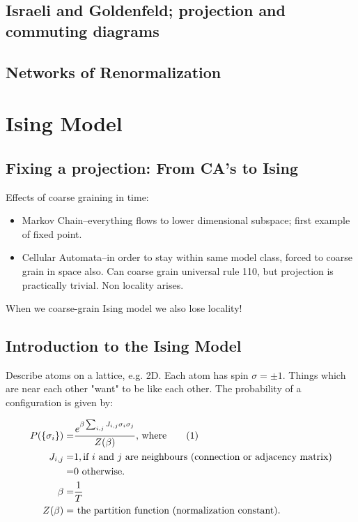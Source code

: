 \documentclass[]{article}
\newcommand\numberthis{\addtocounter{equation}{1}\tag{\theequation}}
\begin{document}
\subsection{Israeli and Goldenfeld; projection and commuting diagrams }

\subsection{Networks of Renormalization}

\cite{israeli2004computational,israeli2006coarse,dedeo2018origin}
\section{Ising Model}

\subsection{Fixing a projection: From CA’s to Ising}
Effects of coarse graining in time:
\begin{itemize}
	\item Markov Chain--everything flows to lower dimensional subspace; first example of fixed point.
	\item Cellular Automata--in order to stay within same model class, forced to coarse grain in space also. Can coarse grain universal rule 110, but projection is practically trivial. Non locality arises. 
\end{itemize}

When we coarse-grain Ising model we also lose locality!
\subsection{Introduction to the Ising Model}

Describe atoms on a lattice, e.g. 2D. Each atom has spin $\sigma=\pm 1$. Things which are near each other "want" to be like each other. The probability of a configuration is given by:

\begin{align*}
P(\{\sigma_i\}) =& \frac{e^{\beta \sum_{i,j} J_{i,j} \sigma_i \sigma_j}}{Z(\beta)}\text{, where} \numberthis \label{eq:coarse_ising:P} \\
J_{i,j} =& 1,\text{if $i$ and $j$ are neighbours (connection or adjacency matrix)}\\
=& 0 \text{ otherwise.}\\
\beta =& \frac{1}{T}\\
Z(\beta) =& \text{ the partition function (normalization constant).}
\end{align*}
\end{document}
